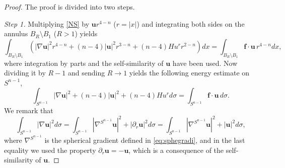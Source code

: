 \documentclass[12pt]{amsart}
\newcommand{\Bu}{{\boldsymbol{u}}}
\newcommand{\Bf}{{\boldsymbol{f}}}
\begin{document}
	\begin{proof} The proof is divided into two steps.
		
		{\it Step 1.} Multiplying \eqref{NS} by $\Bu r^{4-n}$ ($r=|x|$) and integrating both sides on the annulus $B_{R}\setminus B_{1}$ ($R>1$) yields
		\begin{equation*}
			\int_{B_{R}\setminus B_{1}} 
			\left(
			|\nabla \Bu|^2 r^{4-n} +(n-4)|\Bu|^2 r^{3-n}   + (n-4)Hu^r r^{2-n} 
			\right)
			dx = 	\int_{B_{R}\setminus B_{1}} \Bf\cdot \Bu \, r^{4-n} dx,
		\end{equation*} 
		where integration by  parts and the self-similarity of  $\Bu$ have been used.
		Now dividing it by $R-1$ and sending $R\to 1$ yields the following energy estimate on $S^{n-1}$,
		\begin{equation}\label{eq:energyest}
			\int_{S^{n-1}} |\nabla \Bu|^2 +(n-4)|\Bu|^2 + (n-4)Hu^rd\sigma = 	\int_{S^{n-1}} \Bf\cdot \Bu \, d\sigma.
		\end{equation}
		We remark that 
		\begin{equation}\label{eq:Sobolev}
			\int_{S^{n-1}} |\nabla \Bu|^2 d\sigma = \int_{S^{n-1}} \left|\nabla^{S^{n-1}} \Bu\right|^2 + |\partial_r \Bu|^2d\sigma= \int_{S^{n-1}} \left|\nabla^{S^{n-1}} \Bu\right|^2 + | \Bu|^2d\sigma,
		\end{equation}
		where $\nabla^{S^{n-1}}$ is the spherical gradient defined in \eqref{eq:sphegradi}, and in the last equality we  used the property $\partial_r \Bu =-\Bu$, which is a consequence of the self-similarity of $\Bu$.
		
		
		

\end{proof}
\end{document}
